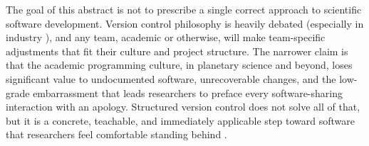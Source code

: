 \documentclass[11pt]{article}
\begin{document}
The goal of this abstract is not to prescribe a single correct approach to scientific software 
development. Version control philosophy is heavily debated (especially in industry \cite{driessen2010}), and any team,
academic or otherwise, will make team-specific adjustments that fit their culture and project structure. 
The narrower claim is that the academic programming culture, in planetary science and beyond, 
loses significant value to undocumented software, unrecoverable changes, and the low-grade embarrassment 
that leads researchers to preface every software-sharing interaction with an apology. 
Structured version control does not solve all of that, but it is a concrete, teachable, 
and immediately applicable step toward software that researchers feel comfortable standing behind \cite{ram2013,carver2022}.

\newpage

\printbibliography
\end{document}
